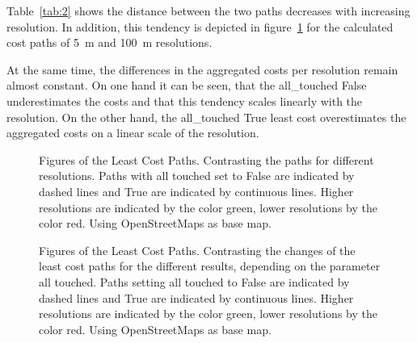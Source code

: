 Table~\ref{tab:2} shows the distance between the two paths decreases
with increasing resolution.
In addition, this tendency is depicted in figure~\ref{fig:paths_resolution} for the calculated cost paths of 5~m and 100~m resolutions.


At the same time, the differences in the aggregated costs per resolution remain almost constant.
On one hand it can be seen, that the all\_touched False underestimates the costs and that this tendency scales
linearly with the resolution.
On the other hand, the all\_touched True least cost overestimates the aggregated costs on a linear scale of
the resolution.


\begin{figure}
	\centering

	\qquad
	\caption{Figures of the Least Cost Paths. Contrasting the paths for different resolutions. Paths with all touched set to False are indicated by dashed lines and True are indicated by continuous lines. Higher resolutions are indicated by the color green, lower resolutions by the color red. Using OpenStreetMaps as base map.}
	\label{fig:paths_resolution}
\end{figure}

\begin{figure}
	\centering

	\qquad

	\caption{Figures of the Least Cost Paths. Contrasting the changes of the least cost paths for the different results, depending on the parameter all touched. Paths setting all touched to False are indicated by dashed lines and True are indicated by continuous lines. Higher resolutions are indicated by the color green, lower resolutions by the color red. Using OpenStreetMaps as base map.}
	\label{fig:paths_alltouched}
\end{figure}

